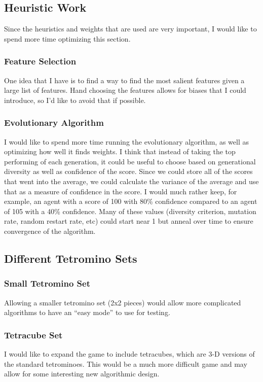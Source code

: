 \documentclass{article}
\begin{document}
\subsection{Heuristic Work}
Since the heuristics and weights that are used are very important, I would like to spend more time optimizing this section.
\subsubsection{Feature Selection}
One idea that I have is to find a way to find the most salient features given a large list of features. Hand choosing the features allows for biases that I could introduce, so I'd like to avoid that if possible.
\subsubsection{Evolutionary Algorithm}
I would like to spend more time running the evolutionary algorithm, as well as optimizing how well it finds weights. I think that instead of taking the top performing of each generation, it could be useful to choose based on generational diversity as well as confidence of the score. Since we could store all of the scores that went into the average, we could calculate the variance of the average and use that as a measure of confidence in the score. I would much rather keep, for example, an agent with a score of 100 with 80\% confidence compared to an agent of 105 with a 40\% confidence. Many of these values (diversity criterion, mutation rate, random restart rate, etc) could start near 1 but anneal over time to ensure convergence of the algorithm.

\subsection{Different Tetromino Sets}

\subsubsection{Small Tetromino Set}
Allowing a smaller tetromino set (2x2 pieces) would allow more complicated algorithms to have an ``easy mode'' to use for testing.

\subsubsection{Tetracube Set}
I would like to expand the game to include tetracubes, which are 3-D versions of the standard tetrominoes. This would be a much more difficult game and may allow for some interesting new algorithmic design.
\end{document}
